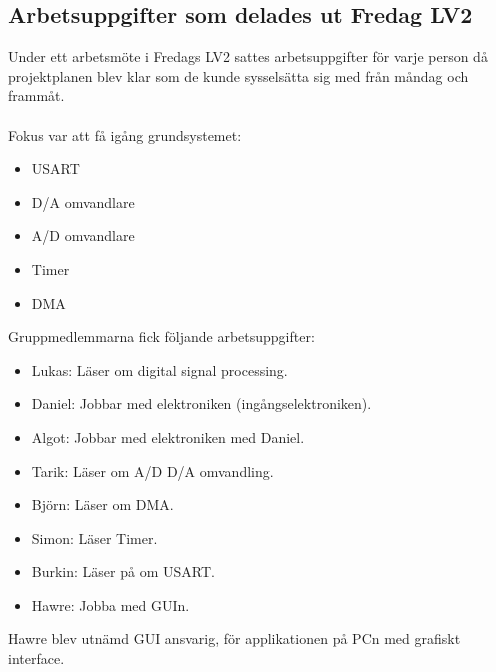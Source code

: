\documentclass[a4paper, 10pt]{article}
\newcommand{\ssect}[1][]{\subsection*{#1}}
\begin{document}
\ssect[Arbetsuppgifter som delades ut Fredag LV2]
Under ett arbetsmöte i Fredags LV2 sattes arbetsuppgifter för varje person då projektplanen blev klar som de kunde sysselsätta sig med från måndag och frammåt. \\
\\
Fokus var att få igång grundsystemet:
\begin{itemize}[noitemsep]
    \item USART
    \item D/A omvandlare
    \item A/D omvandlare
    \item Timer
    \item DMA
\end{itemize}
Gruppmedlemmarna fick följande arbetsuppgifter:
\begin{itemize}[noitemsep]
    \item Lukas: Läser om digital signal processing.
    \item Daniel: Jobbar med elektroniken (ingångselektroniken).
    \item Algot: Jobbar med elektroniken med Daniel.
    \item Tarik: Läser om A/D D/A omvandling.
    \item Björn: Läser om DMA.
    \item Simon: Läser Timer.
    \item Burkin: Läser på om USART.
    \item Hawre: Jobba med GUIn.
\end{itemize}
Hawre blev utnämd GUI ansvarig, för applikationen på PCn med grafiskt interface.
\end{document}
